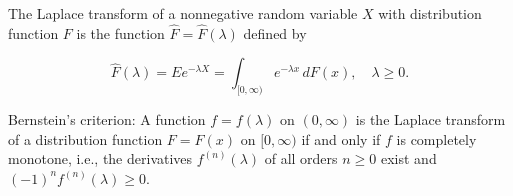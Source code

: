 The Laplace transform of a nonnegative random variable $X$ with distribution function $F$ is the function $\hat{F} = \hat{F}(\lambda)$ defined by

$$\hat{F}(\lambda) = E e^{-\lambda X} = \int_{[0, \infty)} e^{-\lambda x} \, dF(x), \quad \lambda \geq 0.$$

Bernstein's criterion: A function $f = f(\lambda)$ on $(0, \infty)$ is the Laplace transform of a distribution function $F = F(x)$ on $[0, \infty)$ if and only if $f$ is completely monotone, i.e., the derivatives $f^{(n)}(\lambda)$ of all orders $n \geq 0$ exist and $(-1)^n f^{(n)}(\lambda) \geq 0$.
